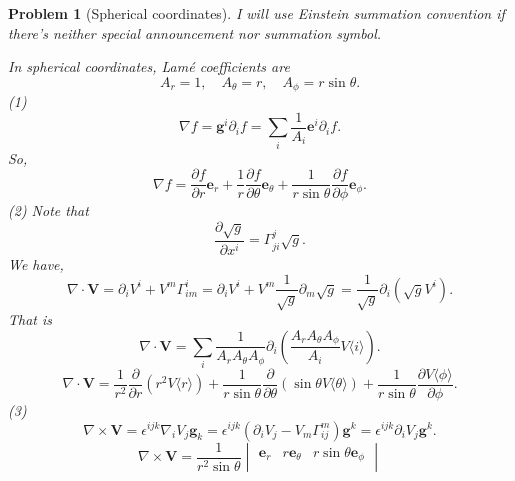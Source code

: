 \documentclass{article}
\theoremstyle{1}
\newtheorem{problem}{Problem}
\newcommand{\pa}{\partial}
\begin{document}
\begin{problem}[Spherical coordinates]

    I will use Einstein summation convention if there's neither special announcement nor summation symbol.

    In spherical coordinates, Lamé coefficients are
    \begin{equation}
        A_r=1,\quad A_\theta=r,\quad A_\phi=r\sin\theta.
    \end{equation}
    (1)
    \begin{equation}
        \nabla f=\mathbf{g}^i\pa_i f=\sum_i \frac{1}{A_i}\mathbf{e}^i\pa_i f.
    \end{equation}
    So,
    \begin{equation}
        \nabla f=\frac{\pa f}{\pa r}\mathbf{e}_r+\frac{1}{r}\frac{\pa f}{\pa \theta}\mathbf{e}_\theta+\frac{1}{r\sin\theta}\frac{\pa f}{\pa \phi}\mathbf{e}_\phi.
    \end{equation}
    (2) Note that
    \begin{equation}
        \frac{\pa \sqrt{g}}{\pa x^i}=\Gamma_{ji}^j\sqrt{g}.
    \end{equation}
    We have,
    \begin{equation}
        \nabla\cdot\mathbf{V}=\pa_i V^i+V^m\Gamma^i_{im}=\pa_iV^i+V^m\frac{1}{\sqrt{g}}\pa_m\sqrt{g}=\frac{1}{\sqrt{g}}\pa_i\left(\sqrt{g}V^i\right).
    \end{equation}
    That is 
    \begin{equation}
        \nabla\cdot\mathbf{V}=\sum_i\frac{1}{A_rA_\theta A_\phi}\pa_i\left(\frac{A_rA_\theta A_\phi}{A_i}V\langle i\rangle \right).
    \end{equation}
    \begin{equation}
        \nabla\cdot \mathbf{V}=\frac{1}{r^2}\frac{\pa}{\pa r}\left(r^2 V \langle r\rangle\right)+\frac{1}{r\sin\theta}\frac{\pa}{\pa \theta}\left(\sin\theta V\langle \theta\rangle\right)+\frac{1}{r\sin\theta}\frac{\pa V\langle \phi\rangle}{\pa \phi}.
    \end{equation}
    (3)
    \begin{equation}
        \nabla\times\mathbf{V}=\epsilon^{ijk}\nabla_i V_j\mathbf{g}_k=\epsilon^{ijk}\left(\pa_i V_j-V_m\Gamma_{ij}^m\right)\mathbf{g}^k=\epsilon^{ijk}\pa_iV_j\mathbf{g}^k.
    \end{equation}
    \begin{equation}
        \nabla\times \mathbf{V}=\frac{1}{r^2\sin\theta}\begin{vmatrix}
  \mathbf{e}_r & r\mathbf{e}_\theta  & r\sin\theta\mathbf{e}_\phi \\

\end{vmatrix}
\end{equation}
\end{problem}
\end{document}
